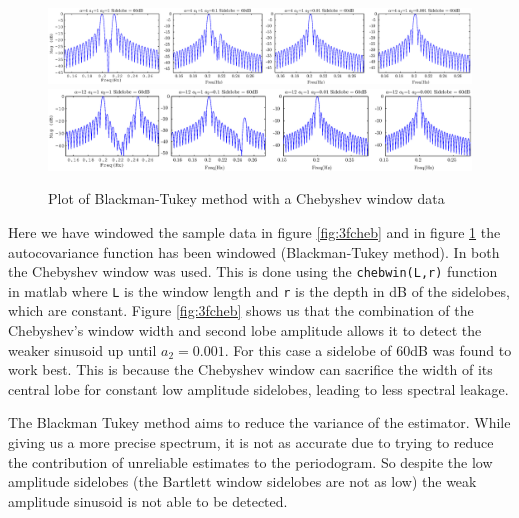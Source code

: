 \documentclass[10pt,twoside,a4paper]{report}
\begin{document}
\begin{figure}[h!]
\centering
\includegraphics[width=\textwidth]{cw1im/3f_bt.eps}
\includegraphics[width=\textwidth]{cw1im/3f_bt12.eps}
\caption{Plot of Blackman-Tukey method with a Chebyshev window data}
\label{fig:3fbt}
\end{figure}
Here we have windowed the sample data in figure \ref{fig:3fcheb} and in figure \ref{fig:3fbt} the autocovariance function has been windowed (Blackman-Tukey method). In both the Chebyshev window was used. This is done using the \texttt{chebwin(L,r)} function in matlab where \texttt{L} is the window length and \texttt{r} is the depth in dB of the sidelobes, which are constant. Figure \ref{fig:3fcheb} shows us that the combination of the Chebyshev's window width and second lobe amplitude allows it to detect the weaker sinusoid up until $a_2 = 0.001$. For this case a sidelobe of $60$dB was found to work best. This is because the Chebyshev window can sacrifice the width of its central lobe for constant low amplitude sidelobes, leading to less spectral leakage.



The Blackman Tukey method aims to reduce the variance of the estimator. While giving us a more precise spectrum, it is not as accurate due to trying to reduce the contribution of unreliable estimates to the periodogram. So despite the low amplitude sidelobes (the Bartlett window sidelobes are not as low) the weak amplitude sinusoid is not able to be detected.
\end{document}
